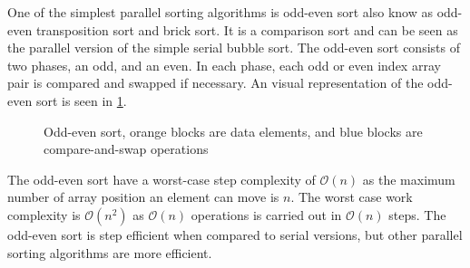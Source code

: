 One of the simplest parallel sorting algorithms is odd-even sort also know as odd-even transposition sort and brick sort. It is a comparison sort and can be seen as the parallel version of the simple serial bubble sort. The odd-even sort consists of two phases, an odd, and an even. In each phase, each odd or even index array pair is compared and swapped if necessary. An visual representation of the odd-even sort is seen in \cref{fig:sort_odd_even}.

\begin{figure}[ht]
	\centering
	\caption{Odd-even sort, orange blocks are data elements, and blue blocks are compare-and-swap operations}
	\label{fig:sort_odd_even}
\end{figure}  

The odd-even sort have a worst-case step complexity of $\mathcal{O}(n)$ as the maximum number of array position an element can move is $n$. The worst case work complexity is $\mathcal{O}(n^2)$ as $\mathcal{O}(n)$ operations is carried out in $\mathcal{O}(n)$ steps. The odd-even sort is step efficient when compared to serial versions, but other parallel sorting algorithms are more efficient.   